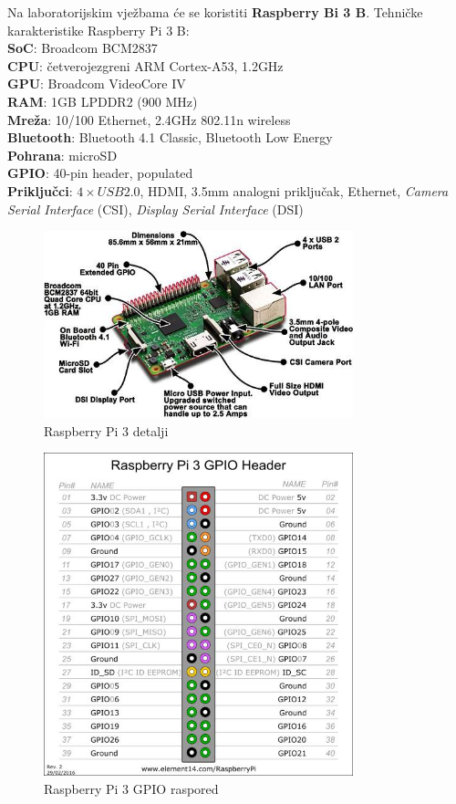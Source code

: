 \documentclass[11pt]{article}
\begin{document}
\newline
\newline
Na laboratorijskim vježbama će se koristiti \textbf{Raspberry Bi 3 B}.
\newline
\newline
Tehničke karakteristike Raspberry Pi 3 B: \\
\textbf{SoC}: Broadcom BCM2837 \\
\textbf{CPU}: četverojezgreni ARM Cortex-A53, 1.2GHz \\
\textbf{GPU}: Broadcom VideoCore IV \\
\textbf{RAM}: 1GB LPDDR2 (900 MHz) \\
\textbf{Mreža}: 10/100 Ethernet, 2.4GHz 802.11n wireless \\
\textbf{Bluetooth}: Bluetooth 4.1 Classic, Bluetooth Low Energy \\
\textbf{Pohrana}: microSD \\
\textbf{GPIO}: 40-pin header, populated \\
\textbf{Priključci}: $4\times USB 2.0$, HDMI, 3.5mm analogni priključak,
 Ethernet, \textit{Camera Serial Interface} (CSI), \textit{Display Serial
 Interface} (DSI)
\begin{figure}[h!]
\centering
\includegraphics[width=0.8\textwidth]{rpi-3-details.jpg}
\captionsetup{justification=centering}
\caption{Raspberry Pi 3 detalji}
\end{figure}
\begin{figure}[h!]
\centering
\includegraphics[width=0.8\textwidth]{rpi-3-pins.jpg}
\captionsetup{justification=centering}
\caption{Raspberry Pi 3 GPIO raspored}
\end{figure}
\end{document}
